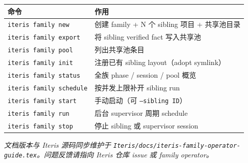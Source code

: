 \documentclass[11pt,a4paper]{ctexart}
\begin{document}
\begin{center}
\begin{longtable}{p{4.2cm}p{9.8cm}}
\toprule
命令 & 作用 \\
\midrule
\endhead
\texttt{iteris family new} & 创建 family + N 个 sibling 项目 + 共享池目录 \\
\texttt{iteris family export} & 将 sibling verified fact 写入共享池 \\
\texttt{iteris family pool} & 列出共享池条目 \\
\texttt{iteris family init} & 注册已有 sibling layout（adopt symlink） \\
\texttt{iteris family status} & 全族 phase / session / pool 概览 \\
\texttt{iteris family schedule} & 按并发上限补开 sibling run \\
\texttt{iteris family start} & 手动启动（可 \texttt{--sibling ID}） \\
\texttt{iteris family run} & 后台 supervisor 周期 schedule \\
\texttt{iteris family stop} & 停止 sibling 或 supervisor session \\
\bottomrule
\end{longtable}
\end{center}

\vfill
\noindent\textit{文档版本与 Iteris 源码同步维护于 \texttt{Iteris/docs/iteris-family-operator-guide.tex}。问题反馈请指向 Iteris 仓库 issue 或 family operator。}
\end{document}
